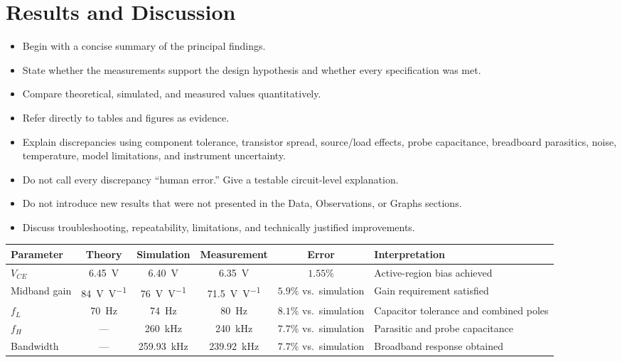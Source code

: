 \documentclass[11pt,a4paper]{article}
\begin{document}
\section{Results and Discussion}
\begin{sectionguide}
\begin{itemize}
  \item Begin with a concise summary of the principal findings.
  \item State whether the measurements support the design hypothesis and
        whether every specification was met.
  \item Compare theoretical, simulated, and measured values quantitatively.
  \item Refer directly to tables and figures as evidence.
  \item Explain discrepancies using component tolerance, transistor spread,
        source/load effects, probe capacitance, breadboard parasitics, noise,
        temperature, model limitations, and instrument uncertainty.
  \item Do not call every discrepancy ``human error.'' Give a testable
        circuit-level explanation.
  \item Do not introduce new results that were not presented in the Data,
        Observations, or Graphs sections.
  \item Discuss troubleshooting, repeatability, limitations, and technically
        justified improvements.
\end{itemize}
\end{sectionguide}

\begin{center}
\small
\begin{tabular}{lccccp{36mm}}
\toprule
Parameter & Theory & Simulation & Measurement & Error & Interpretation \\
\midrule
$V_{CE}$ &
\SI{6.45}{\volt} &
\SI{6.40}{\volt} &
\SI{6.35}{\volt} &
$1.55\%$ &
Active-region bias achieved \\

Midband gain &
\SI{84}{\volt\per\volt} &
\SI{76}{\volt\per\volt} &
\SI{71.5}{\volt\per\volt} &
$5.9\%$ vs.\ simulation &
Gain requirement satisfied \\

$f_L$ &
\SI{70}{\hertz} &
\SI{74}{\hertz} &
\SI{80}{\hertz} &
$8.1\%$ vs.\ simulation &
Capacitor tolerance and combined poles \\

$f_H$ &
--- &
\SI{260}{\kilo\hertz} &
\SI{240}{\kilo\hertz} &
$7.7\%$ vs.\ simulation &
Parasitic and probe capacitance \\

Bandwidth &
--- &
\SI{259.93}{\kilo\hertz} &
\SI{239.92}{\kilo\hertz} &
$7.7\%$ vs.\ simulation &
Broadband response obtained \\
\bottomrule
\end{tabular}
\end{center}
\end{document}
